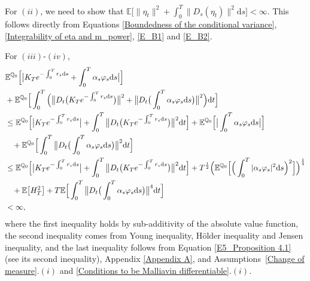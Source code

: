 \documentclass[12,reqno]{amsart}
\numberwithin{equation}{section}
\begin{document}
For $(ii)$, we need to show that $\mathbb{E}\Big[\|\eta_{t}\|^{2}+\int_{0}^{T}\|D_{s}(\eta_{t})\|^{2}\mathrm{d}s\Big]<\infty$. This follows directly from Equations \eqref{Boundedness of the conditional variance}, \eqref{Integrability of eta and m_power}, \eqref{E_B1} and \eqref{E_B2}.

For $(iii)$-$(iv)$,
\begin{align}
	&\mathbb{E}^{\mathbb{Q}_{0}}\Big[\big|K_{T}e^{-\int_{0}^{T}r_{s}\mathrm{d}s}+\int_{0}^{T}\alpha_{s}\varphi_{s}\mathrm{d}s\big|\Big]\notag\\
	&+\mathbb{E}^{\mathbb{Q}_{0}}\Big[\int_{0}^{T}\Big(\big\|D_{t}\big(K_{T}e^{-\int_{0}^{T}r_{s}\mathrm{d}s}\big)\big\|^{2}+\big\|D_{t}\big(\int_{0}^{T}\alpha_{s}\varphi_{s}\mathrm{d}s\big)\big\|^{2}\Big)\mathrm{d}t\Big]\notag\\
	&\le\mathbb{E}^{\mathbb{Q}_{0}}\Big[\big|K_{T}e^{-\int_{0}^{T}r_{s}\mathrm{d}s}\big|+\int_{0}^{T}\big\|D_{t}\big(K_{T}e^{-\int_{0}^{T}r_{s}\mathrm{d}s}\big)\big\|^{2}\mathrm{d}t\Big]+\mathbb{E}^{\mathbb{Q}_{0}}\Big[\big|\int_{0}^{T}\alpha_{s}\varphi_{s}\mathrm{d}s\big|\Big]\notag\\
	&\phantom{X}+\mathbb{E}^{\mathbb{Q}_{0}}\Big[\int_{0}^{T}\big\|D_{t}\big(\int_{0}^{T}\alpha_{s}\varphi_{s}\mathrm{d}s\big)\big\|^{2}\mathrm{d}t\Big]\notag\\
	&\le\mathbb{E}^{\mathbb{Q}_{0}}\Big[\big|K_{T}e^{-\int_{0}^{T}r_{s}\mathrm{d}s}\big|+\int_{0}^{T}\big\|D_{t}\big(K_{T}e^{-\int_{0}^{T}r_{s}\mathrm{d}s}\big)\big\|^{2}\mathrm{d}t\Big]+T^{\frac{1}{2}}\Big(\mathbb{E}^{\mathbb{Q}_{0}}\Big[\Big(\int_{0}^{T}|\alpha_{s}\varphi_{s}|^{2}\mathrm{d}s\Big)^{2}\Big]\Big)^{\frac{1}{4}}\notag\\
	&\phantom{X}+\mathbb{E}\big[H_{T}^{2}\big]+T\mathbb{E}\Big[\int_{0}^{T}\big\|D_{t}\big(\int_{0}^{T}\alpha_{s}\varphi_{s}\mathrm{d}s\big)\big\|^{4}\mathrm{d}t\Big]\notag\\
	&<\infty,
\end{align}
where the first inequality holds by sub-additivity of the absolute value function, the second inequality comes from Young inequality, H{\"o}lder inequality and Jensen inequality, and the last inequality follows from Equation \eqref{E5_Proposition 4.1} (see its second inequality), Appendix \ref{Appendix A}, and Assumptions~\ref{Change of measure}$.(i)$ and \ref{Conditions to be Malliavin differentiable}$.(i)$.
\end{document}

